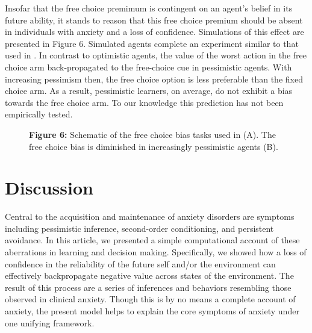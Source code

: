 \documentclass[11pt]{article} %
\begin{document}
Insofar that the free choice premimum is contingent on an agent's belief in its future ability, it stands to reason that this free choice premium should be absent in individuals with anxiety and a loss of confidence. Simulations of this effect are presented in Figure 6. Simulated agents complete an experiment similar to that used in \cite{Leotti2011, Leotti2014}. In contrast to optimistic agents, the value of the worst action in the free choice arm back-propagated to the free-choice cue in pessimistic agents. With increasing pessimism then, the free choice option is less preferable than the fixed choice arm. As a result, pessimistic learners, on average, do not exhibit a bias towards the free choice arm. To our knowledge this prediction has not been empirically tested.

\begin{figure}
  \centerline{%
  }
  \par \textbf{Figure 6:} Schematic of the free choice bias tasks used in \cite{Leotti2011, Leotti2014} (A). The free choice bias is diminished in increasingly pessimistic agents (B).
\end{figure}

\section{Discussion}

Central to the acquisition and maintenance of anxiety disorders are symptoms including pessimistic inference, second-order conditioning, and persistent avoidance. In this article, we presented a simple computational account of these aberrations in learning and decision making. Specifically, we showed how a loss of confidence in the reliability of the future self and/or the environment can effectively backpropagate negative value across states of the environment. The result of this process are a series of inferences and behaviors resembling those observed in clinical anxiety. Though this is by no means a complete account of anxiety, the present model helps to explain the core symptoms of anxiety under one unifying framework.
\end{document}

